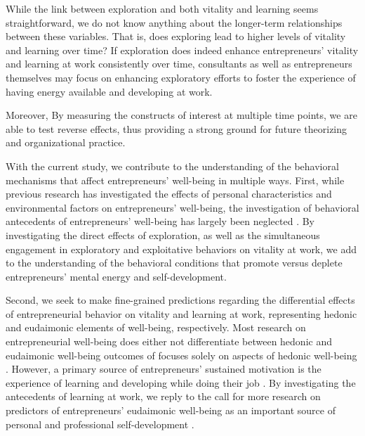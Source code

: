 \documentclass[man, 12pt, a4paper, noextraspace]{apa6}
\begin{document}
While the link between exploration and both vitality and learning seems straightforward, we do not know anything about the longer-term relationships between these variables. 
That is, does exploring lead to higher levels of vitality and learning over time?
If exploration does indeed enhance entrepreneurs' vitality and learning at work consistently over time, consultants as well as entrepreneurs themselves may focus on enhancing exploratory efforts to foster the experience of having energy available and developing at work. 

Moreover, 
By measuring the constructs of interest at multiple time points, we are able to test reverse effects, thus providing a strong ground for future theorizing and organizational practice. \par 

 

With the current study, we contribute to the understanding of the behavioral mechanisms that affect entrepreneurs' well-being in multiple ways. 
First, while previous research has investigated the effects of personal characteristics and environmental factors on entrepreneurs' well-being, the investigation of behavioral antecedents of entrepreneurs' well-being has largely been neglected \parencite[see]{Stephan2018}. 
By investigating the direct effects of exploration, as well as the simultaneous engagement in exploratory and exploitative behaviors on vitality at work, we add to the understanding of the behavioral conditions that promote versus deplete entrepreneurs' mental energy and self-development. \par 

Second, we seek to make fine-grained predictions regarding the differential effects of entrepreneurial behavior on vitality and learning at work, representing hedonic and eudaimonic elements of well-being, respectively. 
Most research on entrepreneurial well-being does either not differentiate between hedonic and eudaimonic well-being outcomes of focuses solely on aspects of hedonic well-being \parencite[see][]{Stephan2018, Ryff2019}. 
However, a primary source of entrepreneurs' sustained motivation is the experience of learning and developing while doing their job \parencite{Jayawarna2013}.   
By investigating the antecedents of learning at work, we reply to the call for more research on predictors of entrepreneurs' eudaimonic well-being as an important source of personal and professional self-development \parencite{Stephan2018, Ryff2019}. \par
\end{document}
